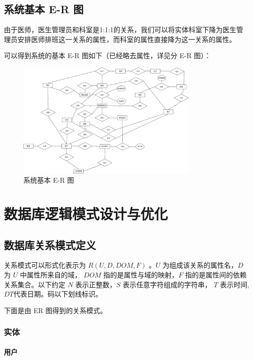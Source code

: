 \documentclass{article}
\begin{document}
\subsection{系统基本 E-R 图}

由于医师，医生管理员和科室是1:1:1的关系，我们可以将实体科室下降为医生管理员安排医师排班这一关系的属性，而科室的属性直接降为这一关系的属性。

可以得到系统的基本 E-R 图如下（已经略去属性，详见分 E-R 图）：

\begin{figure}[H]
    \centering
    \includegraphics[width=0.8\textwidth]{images/basicER.png}
    \caption{系统基本 E-R 图}
\end{figure}

\section{数据库逻辑模式设计与优化}
\subsection{数据库关系模式定义}
关系模式可以形式化表⽰为 $R(U, D, DOM, F)$ 。$U$ 为组成该关系的属性名，$D$ 为 $U$ 中属性所来⾃的域，
$DOM$ 指的是属性与域的映射，$F$ 指的是属性间的依赖关系集合。以下约定 $N$ 表示正整数，$S$ 表示任意字符组成的字符串， $T$ 表示时间, $DT$代表日期。码以下划线标识。

下面是由 ER 图得到的关系模式。

\subsubsection{实体}

\paragraph{用户}
\end{document}

